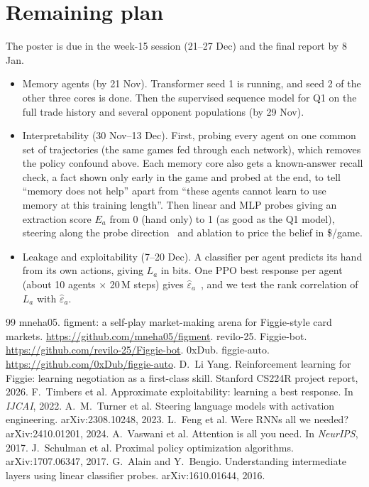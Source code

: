 \documentclass{article}
\begin{document}
\section{Remaining plan}
The poster is due in the week-15 session (21--27 Dec) and the final report by 8 Jan.
\begin{itemize}
  \item Memory agents (by 21 Nov). Transformer seed 1 is running, and seed 2 of the other three cores is done. Then the supervised sequence model for Q1 on the full trade history and several opponent populations (by 29 Nov).
  \item Interpretability (30 Nov--13 Dec). First, probing every agent on one common set of trajectories (the same games fed through each network), which removes the policy confound above. Each memory core also gets a known-answer recall check, a fact shown only early in the game and probed at the end, to tell ``memory does not help'' apart from ``these agents cannot learn to use memory at this training length''. Then linear and MLP probes giving an extraction score $E_a$ from 0 (hand only) to 1 (as good as the Q1 model), steering along the probe direction~\cite{actadd} and ablation to price the belief in \$/game.
  \item Leakage and exploitability (7--20 Dec). A classifier per agent predicts its hand from its own actions, giving $L_a$ in bits. One PPO best response per agent (about 10 agents $\times$ 20\,M steps) gives $\hat\varepsilon_a$~\cite{timbers}, and we test the rank correlation of $L_a$ with $\hat\varepsilon_a$.
\end{itemize}

{\small
\begin{thebibliography}{99}\setlength{\itemsep}{0pt}\setlength{\parskip}{0pt}
 mneha05. \newblock figment: a self-play market-making arena for Figgie-style card markets. \newblock \url{https://github.com/mneha05/figment}.
 revilo-25. \newblock Figgie-bot. \newblock \url{https://github.com/revilo-25/Figgie-bot}.
 0xDub. \newblock figgie-auto. \newblock \url{https://github.com/0xDub/figgie-auto}.
 D.~Li Yang. \newblock Reinforcement learning for Figgie: learning negotiation as a first-class skill. \newblock Stanford CS224R project report, 2026.
 F.~Timbers et al. \newblock Approximate exploitability: learning a best response. \newblock In \emph{IJCAI}, 2022.
 A.~M.~Turner et al. \newblock Steering language models with activation engineering. \newblock arXiv:2308.10248, 2023.
 L.~Feng et al. \newblock Were RNNs all we needed? \newblock arXiv:2410.01201, 2024.
 A.~Vaswani et al. \newblock Attention is all you need. \newblock In \emph{NeurIPS}, 2017.
 J.~Schulman et al. \newblock Proximal policy optimization algorithms. \newblock arXiv:1707.06347, 2017.
 G.~Alain and Y.~Bengio. \newblock Understanding intermediate layers using linear classifier probes. \newblock arXiv:1610.01644, 2016.
\end{thebibliography}
}
\end{document}

